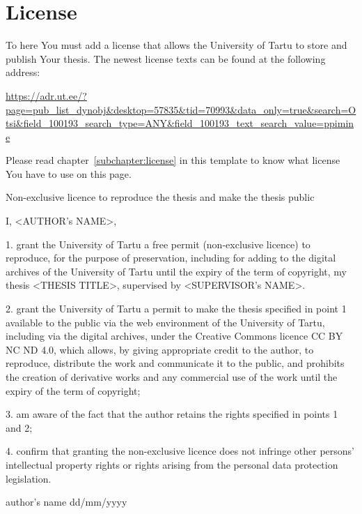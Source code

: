 \section*{License} \label{license} 
To here You must add a license that allows the University of Tartu to store and publish Your thesis. The newest license texts can be found at the following address:

\url{https://adr.ut.ee/?page=pub_list_dynobj&desktop=57835&tid=70993&data_only=true&search=Otsi&field_100193_search_type=ANY&field_100193_text_search_value=ppimine}

Please read chapter~\ref{subchapter:license} in this template to know what license You have to use on this page.


Non-exclusive licence to reproduce the thesis
and make the thesis public

I, <AUTHOR's NAME>,

1. grant the University of Tartu a free permit (non-exclusive licence) to reproduce, for the purpose of preservation, including for adding to the digital archives of the University of Tartu until the expiry of the term of copyright, my thesis <THESIS TITLE>, supervised by <SUPERVISOR's NAME>.

2. grant the University of Tartu a permit to make the thesis specified in point 1 available to the public via the web environment of the University of Tartu, including via the digital archives, under the Creative Commons licence CC BY NC ND 4.0, which allows, by giving appropriate credit to the author, to reproduce, distribute the work and communicate it to the public, and prohibits the creation of derivative works and any commercial use of the work until the expiry of the term of  copyright;

3. am aware of the fact that the author retains the rights specified in points 1 and 2;

4. confirm that granting the non-exclusive licence does not infringe other persons’ intellectual property rights or rights arising from the personal data protection legislation.

author's name
dd/mm/yyyy
